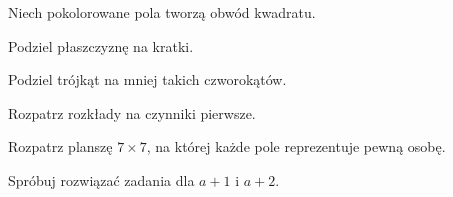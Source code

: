 
\begin{hints_list}
	\item Niech pokolorowane pola tworzą obwód kwadratu.
	\item Podziel płaszczyznę na kratki.
	\item Podziel trójkąt na mniej takich czworokątów.
	\item Rozpatrz rozkłady na czynniki pierwsze.
	\item Rozpatrz planszę $7\times7$, na której każde pole reprezentuje pewną osobę.
	\item Spróbuj rozwiązać zadania dla $a + 1$ i $a + 2$.
\end{hints_list}